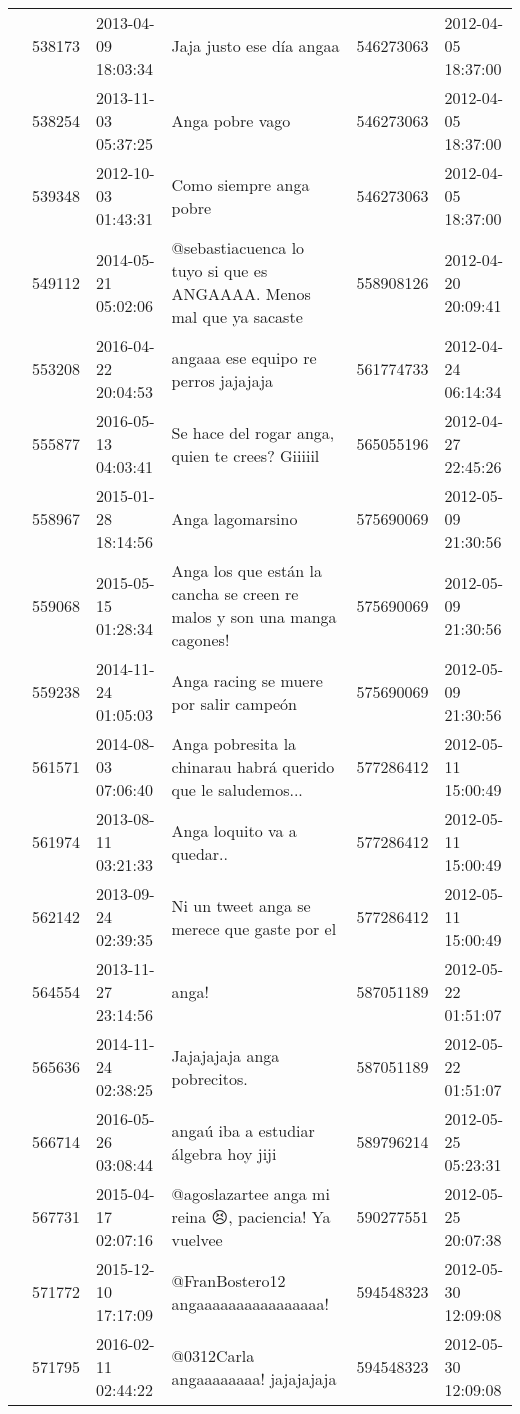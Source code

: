\begin{tabular}{llllrl}
 & 538173& 2013-04-09 18:03:34 & Jaja justo ese día angaa & 546273063 & 2012-04-05 18:37:00 \\
 & 538254& 2013-11-03 05:37:25 &Anga pobre vago & 546273063 & 2012-04-05 18:37:00 \\
 & 539348& 2012-10-03 01:43:31 &Como siempre anga pobre & 546273063 & 2012-04-05 18:37:00 \\
 & 549112& 2014-05-21 05:02:06 &@sebastiacuenca lo tuyo si que es ANGAAAA. Menos mal que ya sacaste & 558908126 & 2012-04-20 20:09:41 \\
 & 553208& 2016-04-22 20:04:53 & angaaa ese equipo re perros jajajaja & 561774733 & 2012-04-24 06:14:34 \\
 & 555877& 2016-05-13 04:03:41 & Se hace del rogar anga, quien te crees? Giiiiil🖕 & 565055196 & 2012-04-27 22:45:26 \\
 & 558967& 2015-01-28 18:14:56 & Anga lagomarsino & 575690069 & 2012-05-09 21:30:56 \\
 & 559068& 2015-05-15 01:28:34 &Anga los que están la cancha se creen re malos y son una manga cagones! & 575690069 & 2012-05-09 21:30:56 \\
 & 559238& 2014-11-24 01:05:03 & Anga racing se muere por salir campeón & 575690069 & 2012-05-09 21:30:56 \\
 & 561571& 2014-08-03 07:06:40 & Anga pobresita la chinarau habrá querido que le saludemos... & 577286412 & 2012-05-11 15:00:49 \\
 & 561974& 2013-08-11 03:21:33 & Anga loquito va a quedar.. & 577286412 & 2012-05-11 15:00:49 \\
 & 562142& 2013-09-24 02:39:35 &Ni un tweet anga se merece que gaste por el & 577286412 & 2012-05-11 15:00:49 \\
 & 564554& 2013-11-27 23:14:56 &anga! & 587051189 & 2012-05-22 01:51:07 \\
 & 565636& 2014-11-24 02:38:25 &Jajajajaja anga pobrecitos. & 587051189 & 2012-05-22 01:51:07 \\
 & 566714& 2016-05-26 03:08:44 &angaú iba a estudiar álgebra hoy jiji & 589796214 & 2012-05-25 05:23:31 \\
 & 567731& 2015-04-17 02:07:16 & @agoslazartee anga mi reina 😣, paciencia! Ya vuelvee & 590277551 & 2012-05-25 20:07:38 \\
 & 571772& 2015-12-10 17:17:09 &@FranBostero12 angaaaaaaaaaaaaaaaa! & 594548323 & 2012-05-30 12:09:08 \\
 & 571795& 2016-02-11 02:44:22 & @0312Carla angaaaaaaaa! jajajajaja & 594548323 & 2012-05-30 12:09:08 \\

\end{tabular}
